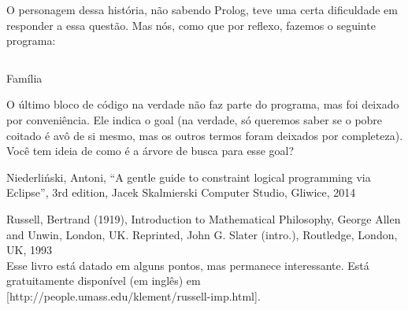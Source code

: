 \documentclass{article}
\begin{document}
O personagem dessa história, não sabendo Prolog, teve uma certa dificuldade em responder a essa
questão. Mas nós, como que por reflexo, fazemos o seguinte programa:

    \begin{listing}[!h]
\inputminted{prolog}{../Exemplos/Cap5/prog1_family.pl}
\caption{Família}
    \end{listing}

O último bloco de código na verdade não faz parte do programa, mas foi deixado por conveniência. Ele
indica o goal (na verdade, só queremos saber se o pobre coitado é avô de si mesmo, mas os outros
termos foram deixados por completeza). Você tem ideia de como é a árvore de busca para esse goal?



  \begin{thebibliography}{2}

    Niederliński, Antoni,
    ``A gentle guide to constraint logical programming via Eclipse'',
    3rd edition, Jacek Skalmierski Computer Studio, Gliwice, 2014

     Russell, Bertrand (1919), Introduction to Mathematical Philosophy, George Allen and Unwin, London, UK. Reprinted, John G. Slater (intro.), Routledge, London, UK, 1993
    \\Esse livro está datado em alguns pontos, mas permanece interessante. Está gratuitamente disponível (em inglês) em [http://people.umass.edu/klement/russell-imp.html].

  \end{thebibliography}
\end{document}
